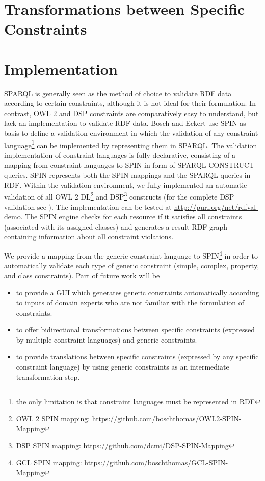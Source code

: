 \documentclass{llncs}
\begin{document}
\section{Transformations between Specific Constraints}

\section{Implementation}

SPARQL is generally seen as the method of choice to validate RDF data according to certain constraints, although it is not ideal for their formulation. 
In contrast, OWL 2 and DSP constraints are comparatively easy to understand, but lack an implementation to validate RDF data. 
Bosch and Eckert\cite{BoschEckert2014-2} use SPIN as basis to define a
validation environment in which the validation of any constraint language\footnote{the only limitation is that constraint languages must be represented in RDF} can be implemented by representing them in SPARQL. 
The validation implementation of constraint languages is fully declarative,
consisting of a mapping from constraint languages to SPIN in form of SPARQL CONSTRUCT queries.
SPIN represents both the SPIN mappings and the SPARQL queries in RDF. 
Within the validation environment, we fully implemented an automatic validation of all OWL 2 DL\footnote{OWL 2 SPIN mapping: \url{https://github.com/boschthomas/OWL2-SPIN-Mapping}} and DSP\footnote{DSP SPIN mapping: \url{https://github.com/dcmi/DSP-SPIN-Mapping}} constructs (for the complete DSP validation see \cite{BoschEckert2014-2}). 
The implementation can be tested at \url{http://purl.org/net/rdfval-demo}.
The SPIN engine checks for each resource if it satisfies all constraints (associated with its assigned classes) and generates a result RDF graph containing information about all constraint violations.

We provide a mapping from the generic constraint language to SPIN\footnote{GCL SPIN mapping: \url{https://github.com/boschthomas/GCL-SPIN-Mapping}} in order to automatically validate each type of generic constraint (simple, complex, property, and class constraints).
Part of future work will be 
\begin{itemize}
	\item to provide a GUI which generates generic constraints automatically according to inputs of domain experts who are not familiar with the formulation of constraints.
	\item to offer bidirectional transformations between specific constraints (expressed by multiple constraint languages) and generic constraints. 
	\item to provide translations between specific constraints (expressed by any specific constraint language) by using generic constraints as an intermediate transformation step.
\end{itemize}
\end{document}
